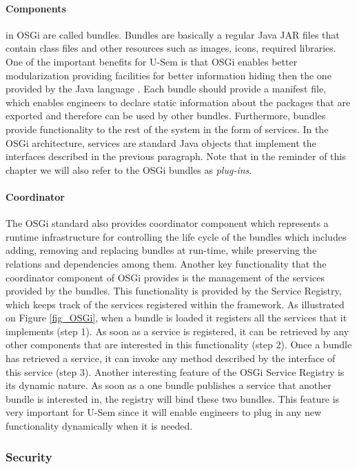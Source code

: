 \paragraph{Components}
  in OSGi are called bundles. Bundles are basically a regular Java JAR files that contain class files and other resources such as images, icons, required libraries. One of the important benefits for U-Sem is that OSGi enables better modularization providing facilities for better information hiding then the one provided by the Java language \cite{tavares2008gentle}. Each bundle should provide a manifest file, which enables engineers to declare static information about the packages that are exported and therefore can be used by other bundles. Furthermore, bundles provide functionality to the rest of the system in the form of services. In the OSGi architecture, services are standard Java objects that implement the interfaces described in the previous paragraph. Note that in the reminder of this chapter we will also refer to the OSGi bundles as \textit{plug-ins}.

\paragraph{Coordinator}
The OSGi standard also provides coordinator component which represents a runtime infrastructure for controlling the life cycle of the bundles which includes adding, removing and replacing bundles at run-time, while preserving the relations and dependencies among them. Another key functionality that the coordinator component of OSGi provides is the management of the services provided by the bundles. This functionality is provided by the Service Registry, which keeps track of the services registered within the framework. As illustrated on Figure \ref{fig_OSGi}, when a bundle is loaded it registers all the services that it implements (step 1). As soon as a service is registered, it can be retrieved by any other components that are interested in this functionality (step 2). Once a bundle has retrieved a service, it can invoke any method described by the interface of this service (step 3). Another interesting feature of the OSGi Service Registry is its dynamic nature. As soon as a one bundle publishes a service that another bundle is interested in, the registry will bind these two bundles. This feature is very important for U-Sem since it will enable engineers to plug in any new functionality dynamically when it is needed.

\subsubsection{Security}

